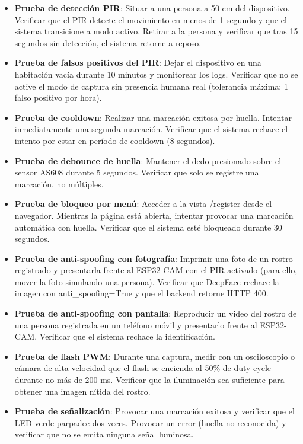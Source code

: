 \begin{itemize}
    \item \textbf{Prueba de detección PIR}: Situar a una persona a 50 cm del dispositivo. Verificar que el PIR detecte el movimiento en menos de 1 segundo y que el sistema transicione a modo activo. Retirar a la persona y verificar que tras 15 segundos sin detección, el sistema retorne a reposo.

    \item \textbf{Prueba de falsos positivos del PIR}: Dejar el dispositivo en una habitación vacía durante 10 minutos y monitorear los logs. Verificar que no se active el modo de captura sin presencia humana real (tolerancia máxima: 1 falso positivo por hora).

    \item \textbf{Prueba de cooldown}: Realizar una marcación exitosa por huella. Intentar inmediatamente una segunda marcación. Verificar que el sistema rechace el intento por estar en período de cooldown (8 segundos).

    \item \textbf{Prueba de debounce de huella}: Mantener el dedo presionado sobre el sensor AS608 durante 5 segundos. Verificar que solo se registre una marcación, no múltiples.

    \item \textbf{Prueba de bloqueo por menú}: Acceder a la vista /register desde el navegador. Mientras la página está abierta, intentar provocar una marcación automática con huella. Verificar que el sistema esté bloqueado durante 30 segundos.

    \item \textbf{Prueba de anti-spoofing con fotografía}: Imprimir una foto de un rostro registrado y presentarla frente al ESP32-CAM con el PIR activado (para ello, mover la foto simulando una persona). Verificar que DeepFace rechace la imagen con anti\_spoofing=True y que el backend retorne HTTP 400.

    \item \textbf{Prueba de anti-spoofing con pantalla}: Reproducir un video del rostro de una persona registrada en un teléfono móvil y presentarlo frente al ESP32-CAM. Verificar que el sistema rechace la identificación.

    \item \textbf{Prueba de flash PWM}: Durante una captura, medir con un osciloscopio o cámara de alta velocidad que el flash se encienda al 50\% de duty cycle durante no más de 200 ms. Verificar que la iluminación sea suficiente para obtener una imagen nítida del rostro.

    \item \textbf{Prueba de señalización}: Provocar una marcación exitosa y verificar que el LED verde parpadee dos veces. Provocar un error (huella no reconocida) y verificar que no se emita ninguna señal luminosa.
\end{itemize}


